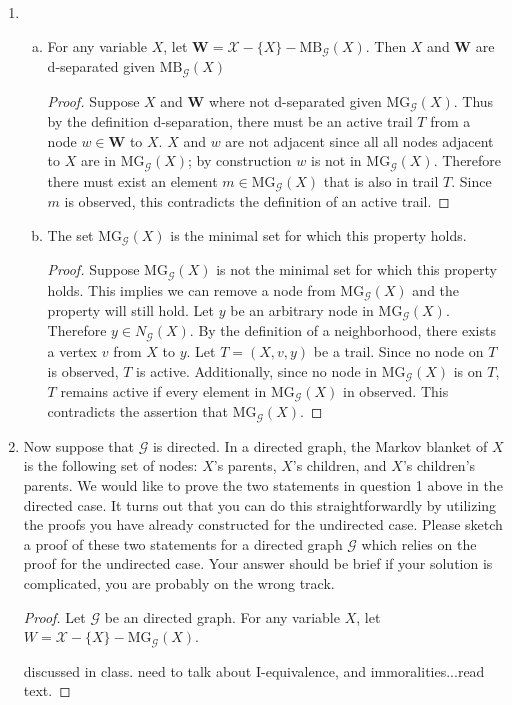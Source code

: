 \documentclass[12pt]{article}
\newcommand{\mg} {
\text{MG}_{\mathcal{G}}
}
\begin{document}
\begin{enumerate}[1.]	
	\item 
	\begin{enumerate}[(a)]
		\item For any variable $X$, let $\mathbf{W} = \mathcal{X} - \{X\} - \text{MB}_{\mathcal{G}}(X)$. Then $X$ and $\mathbf{W}$ are d-separated given $\text{MB}_{\mathcal{G}}(X)$
		\begin{proof}
		Suppose $X$ and $\mathbf{W}$ where not d-separated given $\text{MG}_{\mathcal{G}}(X)$. Thus by the definition d-separation, there must be an active trail $T$  from a node $w\in \mathbf{W}$ to $X$. $X$ and $w$ are not adjacent since all all nodes adjacent to $X$ are in $\text{MG}_{\mathcal{G}}(X)$; by construction $w$ is not in $\text{MG}_{\mathcal{G}}(X)$. Therefore there must exist an element $m \in \text{MG}_{\mathcal{G}}(X)$ that is also in trail $T$. Since $m$ is observed, this contradicts the definition of an active trail.
		\end{proof}
	\item The set $\text{MG}_{\mathcal{G}}(X)$ is the minimal set for which this property holds. 
		\begin{proof}
		Suppose $\mg(X)$ is not the minimal set for which this property holds. This implies we can remove a node from $\mg(X)$ and the property will still hold. Let $y$ be an arbitrary node in $\mg(X)$. Therefore $y \in N_\mathcal{G}(X)$. By the definition of a neighborhood, there exists a vertex $v$ from $X$ to $y$.  Let $T = (X, v, y)$ be a trail. Since no node on $T$ is observed, $T$ is active. Additionally, since no node in $\mg(X)$ is on $T$, $T$ remains active if every element in $\mg(X)$ in observed. This contradicts the assertion that $\mg(X)$. 
		\end{proof}
	\end{enumerate}
	\item 
			Now suppose that $\mathcal{G}$ is directed. In a directed graph, the Markov blanket of $X$ is the following set of nodes: $X$'s parents, $X$'s children, and $X$'s children’s parents. We would like to prove the two statements in question 1 above in the directed case. It turns out that you can do this straightforwardly by utilizing the proofs you have already constructed for the undirected case. Please sketch a proof of these two statements for a directed graph $\mathcal{G}$ which relies on the proof for the undirected case. Your answer should be brief if your solution is complicated, you are probably on the wrong track.
\begin{proof}
Let $\mathcal{G}$ be an directed graph. For any variable $X$, let $W = \mathcal{X} - \{ X\} - \mg(X)$. 

discussed in class. need to talk about I-equivalence, and immoralities...read text.
\end{proof}

\end{enumerate}
\end{document}
